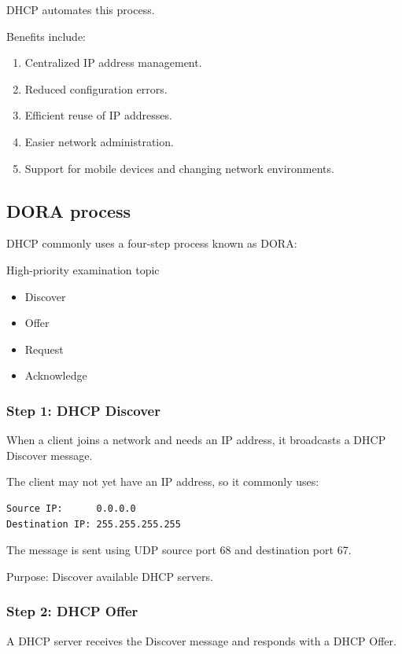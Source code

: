 DHCP automates this process.

Benefits include:

\begin{enumerate}
\item Centralized IP address management.
\item Reduced configuration errors.
\item Efficient reuse of IP addresses.
\item Easier network administration.
\item Support for mobile devices and changing network environments.
\end{enumerate}

\subsection{DORA process}

DHCP commonly uses a four-step process known as DORA:

High-priority examination topic

\begin{itemize}
\item Discover
\item Offer
\item Request
\item Acknowledge
\end{itemize}

\subsubsection{Step 1: DHCP Discover}

When a client joins a network and needs an IP address, it broadcasts a DHCP Discover message.

The client may not yet have an IP address, so it commonly uses:

\begin{lstlisting}
Source IP:      0.0.0.0
Destination IP: 255.255.255.255
\end{lstlisting}

The message is sent using UDP source port 68 and destination port 67.

Purpose: Discover available DHCP servers.

\subsubsection{Step 2: DHCP Offer}

A DHCP server receives the Discover message and responds with a DHCP Offer.

